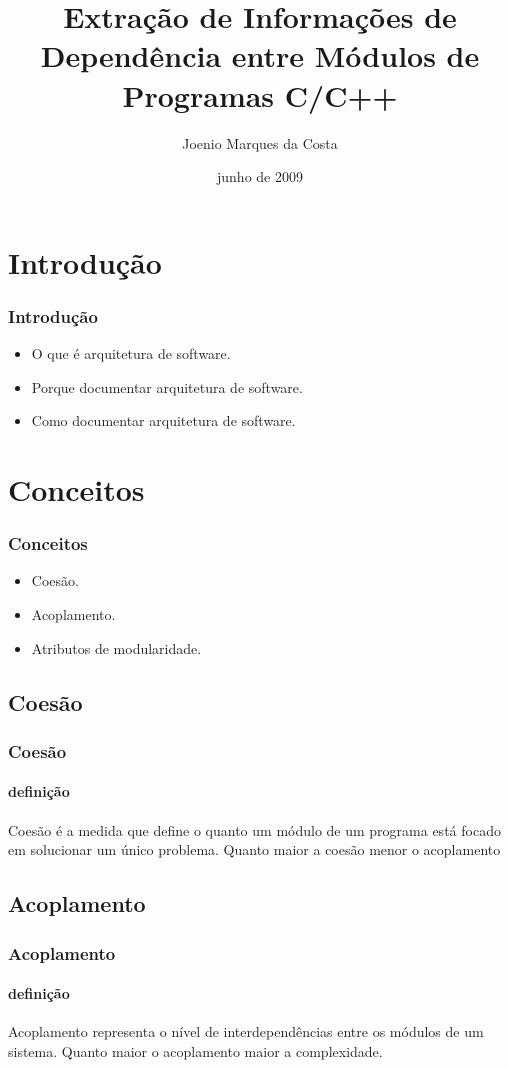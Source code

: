 \documentclass{beamer}
\title[Universidade Católica do Salvador]{Extração de Informações de Dependência entre Módulos de Programas C/C++}
\author[Joenio Costa]{Joenio Marques da Costa}
\institute{UCSal - Universidade Católica do Salvador}
\date{junho de 2009}
\begin{document}
\frame{\titlepage} %

\begin{frame}
 \tableofcontents
\end{frame}

\section{Introdução}

\begin{frame}
\frametitle{Introdução}
  \begin{itemize}
  \item<1-> O que é arquitetura de software.
  \item<1-> Porque documentar arquitetura de software.
  \item<1-> Como documentar arquitetura de software.
  \end{itemize}
\end{frame}

\section{Conceitos}

\begin{frame}
\frametitle{Conceitos}
  \begin{itemize}
  \item<1-> Coesão.
  \item<1-> Acoplamento.
  \item<1-> Atributos de modularidade.
  \end{itemize}
\end{frame}

\subsection{Coesão}

\begin{frame}
\frametitle{Coesão}
\framesubtitle{definição}
Coesão é a medida que define o quanto um módulo de um programa está focado em
solucionar um único problema. Quanto maior a coesão menor o acoplamento
\end{frame}

\subsection{Acoplamento}

\begin{frame}
\frametitle{Acoplamento}
\framesubtitle{definição}
Acoplamento representa o nível de interdependências entre os módulos de um
sistema. Quanto maior o acoplamento maior a complexidade.
\end{frame}
\end{document}
